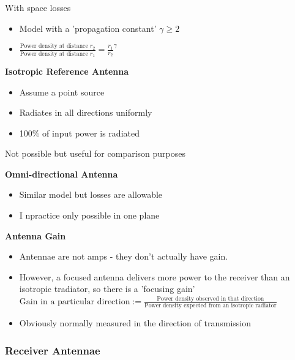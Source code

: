 \documentclass[12pt]{article}
\begin{document}
With space losses
\begin{itemize}[noitemsep]
    \item Model with a 'propagation constant' $\gamma \ge 2$
    \item \begin{math}
    \frac{\text{Power density at distance }r_2}{\text{Power density at distance }r_1} = \frac{r_1}{r_2}^\gamma
    \end{math}
\end{itemize}

\textbf{Isotropic Reference Antenna}
\begin{itemize}[noitemsep]
    \item Assume a point source
    \item Radiates in all directions uniformly
    \item 100\% of input power is radiated
\end{itemize}
Not possible but useful for comparison purposes

\textbf{Omni-directional Antenna}
\begin{itemize}[noitemsep]
    \item Similar model but losses are allowable
    \item I npractice only possible in one plane
\end{itemize}

\textbf{Antenna Gain}
\begin{itemize}[noitemsep]
    \item Antennae are not amps - they don't actually have gain.
    \item However, a focused antenna delivers more power to the receiver than an isotropic tradiator, so there is a 'focusing gain'\\[1em]

    \begin{math}
    \text{Gain in a particular direction} := \frac{\text{Power density observed in that direction}}{\text{Power density expected from an isotropic radiator}}
    \end{math}\\[1em]

    \item Obviously normally measured in the direction of transmission
\end{itemize}

\subsubsection{Receiver Antennae}
\end{document}
